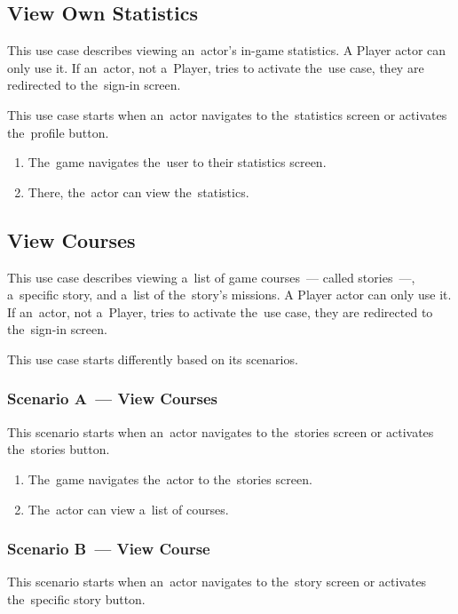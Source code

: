 \subsection{View Own Statistics}

This use case describes viewing an~actor's in-game statistics.
A Player actor can only use it.
If an~actor, not a~Player, tries to activate the~use case, they are redirected to the~sign-in screen.

This use case starts when an~actor navigates to the~statistics screen or activates the~profile button.

\begin{enumerate}
    \item The~game navigates the~user to their statistics screen.
    \item There, the~actor can view the~statistics.
\end{enumerate}

\pagebreak
\subsection{View Courses}

This use case describes viewing a~list of game courses~--- called stories~---, a~specific story, and a~list of the~story's missions.
A Player actor can only use it.
If an~actor, not a~Player, tries to activate the~use case, they are redirected to the~sign-in screen.

This use case starts differently based on its scenarios.

\subsubsection*{Scenario A~--- View Courses}

This scenario starts when an~actor navigates to the~stories screen or activates the~stories button.

\begin{enumerate}
    \item The~game navigates the~actor to the~stories screen.
    \item The~actor can view a~list of courses.
\end{enumerate}

\subsubsection*{Scenario B~--- View Course}

This scenario starts when an~actor navigates to the~story screen or activates the~specific story button.

